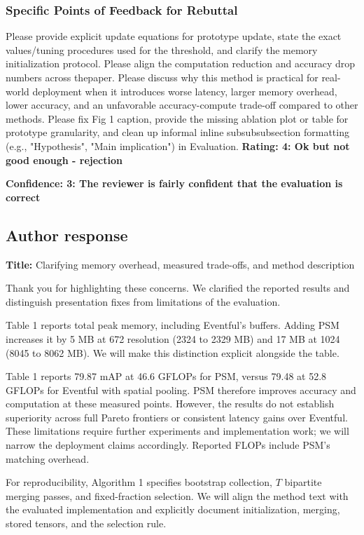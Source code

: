 \documentclass[11pt]{article}
\begin{document}
\subsubsection*{Specific Points of Feedback for Rebuttal}
Please provide explicit update equations for prototype update, state the exact values/tuning procedures used for the threshold, and clarify the memory initialization protocol.
Please align the computation reduction and accuracy drop numbers across thepaper.
Please discuss why this method is practical for real-world deployment when it introduces worse latency, larger memory overhead, lower accuracy, and an unfavorable accuracy-compute trade-off compared to other methods.
Please fix Fig 1 caption, provide the missing ablation plot or table for prototype granularity, and clean up informal inline subsubsubsection formatting (e.g., "Hypothesis", "Main implication") in Evaluation.
\noindent\textbf{Rating: 4: Ok but not good enough - rejection}\par
\noindent\textbf{Confidence: 3: The reviewer is fairly confident that the evaluation is correct}\par

\subsection{Author response}

\textbf{Title:} Clarifying memory overhead, measured trade-offs, and method description

Thank you for highlighting these concerns. We clarified the reported results and distinguish presentation fixes from limitations of the evaluation.

Table 1 reports total peak memory, including Eventful's buffers. Adding PSM increases it by 5 MB at 672 resolution (2324 to 2329 MB) and 17 MB at 1024 (8045 to 8062 MB). We will make this distinction explicit alongside the table.

Table 1 reports 79.87 mAP at 46.6 GFLOPs for PSM, versus 79.48 at 52.8 GFLOPs for Eventful with spatial pooling. PSM therefore improves accuracy and computation at these measured points. However, the results do not establish superiority across full Pareto frontiers or consistent latency gains over Eventful. These limitations require further experiments and implementation work; we will narrow the deployment claims accordingly. Reported FLOPs include PSM's matching overhead.

For reproducibility, Algorithm 1 specifies bootstrap collection, $T$ bipartite merging passes, and fixed-fraction selection. We will align the method text with the evaluated implementation and explicitly document initialization, merging, stored tensors, and the selection rule.
\end{document}
